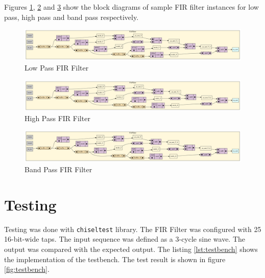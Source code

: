 \documentclass[a4paper,12pt]{article}
\begin{document}
\vspace{0.3cm}

\noindent
Figures \ref{fig:lowpass}, \ref{fig:highpass} and \ref{fig:bandpass} show the block diagrams of sample FIR filter instances for low pass, high pass and band pass respectively.

\begin{figure}[ht]
    \centering
    \includegraphics[width=\textwidth]{images/lowpass.png}
    \caption{Low Pass FIR Filter}
    \label{fig:lowpass}
\end{figure}

\begin{figure}[ht]
    \centering
    \includegraphics[width=\textwidth]{images/highpass.png}
    \caption{High Pass FIR Filter}
    \label{fig:highpass}
\end{figure}

\begin{figure}[ht]
    \centering
    \includegraphics[width=\textwidth]{images/bandpass.png}
    \caption{Band Pass FIR Filter}
    \label{fig:bandpass}
\end{figure}

\section{Testing}

Testing was done with \lstinline|chiseltest| library. The FIR Filter was configured with 25 16-bit-wide taps. The input sequence was defined as a 3-cycle sine wave. The output was compared with the expected output. The listing \ref{lst:testbench} shows the implementation of the testbench. The test result is shown in figure \ref{fig:testbench}.

\vspace{0.3cm}
\end{document}
